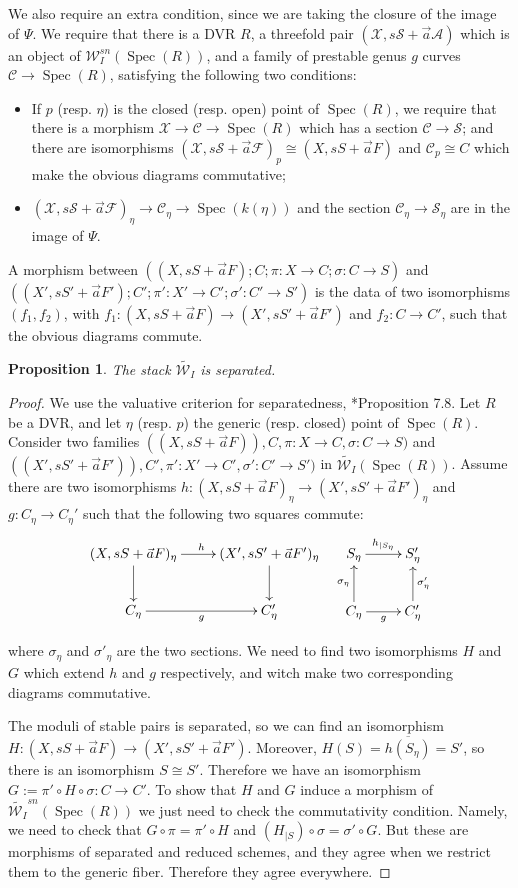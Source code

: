 \documentclass[11pt]{amsart}
\newcommand{\cC}{\mathcal{C}}
\newcommand{\cE}{\mathcal{W}}
\newcommand{\cX}{\mathcal{X}}
\newcommand{\cS}{\mathcal{S}}
\newcommand{\spec}{\operatorname{Spec}}
\newtheorem{Prop}[theorem]{Proposition}
\theoremstyle{definition}
\begin{document}
We also require an extra condition, since we are taking the closure of the image of $\Psi$.
We require that there is a DVR $R$, a
threefold pair $(\cX,s\cS+\vec{a}\mathcal{A}) $ which is an object
of $\cE_I^{sn}(\spec(R))$, and a family of prestable genus $g$ curves $\cC \to \spec(R)$, satisfying the following two conditions:
\begin{itemize}
 \item If $p$ (resp. $\eta$) is the closed (resp. open) point of $\spec(R)$, we require that there is a morphism $\cX \to \cC \to\spec(R)$
 which has a section $\cC \to \cS$; and there are isomorphisms
$(\cX,s\cS+\vec{a}\mathcal{F})_p \cong  (X,sS+\vec{a}F)$ and $\cC_p \cong C$ which make the obvious diagrams commutative;
\item $(\cX,s\cS+\vec{a}\mathcal{F})_\eta \to \cC_\eta \to \spec(k(\eta))$ and the section $\cC_\eta \to \cS_\eta$ are in the
image of $\Psi$.
\end{itemize}
A morphism between $((X,sS+\vec{a}F); C; \pi:X\to C; \sigma:C \to S)$ and
$((X',sS'+\vec{a}F'); C'; \pi':X'\to C'; \sigma':C' \to S')$ is the data of two isomorphisms $(f_1,f_2)$, with
$f_1:(X,sS+\vec{a}F) \to (X',sS'+\vec{a}F')$ and $f_2:C \to C'$, such that the obvious diagrams commute.
\begin{Prop}\label{Prop:the:auxiliary:stack:is:separated}
 The stack $\widetilde{\cE_I}$ is separated.
\end{Prop}
\begin{proof}
We use the valuative criterion for separatedness, \cite{LMB}*{Proposition 7.8}.
Let $R$ be a DVR, and let $\eta$ (resp. $p$) the generic (resp. closed) point of $\spec(R)$. Consider
two families $((X,sS+\vec{a}F)),C, \pi:X \to C, \sigma:C \to S)$ and
$((X',sS'+\vec{a}F')),C', \pi':X' \to C', \sigma':C' \to S')$ in $\widetilde{\cE_I}(\spec(R))$.
Assume there are two isomorphisms $h:(X,sS+\vec{a}F)_\eta \to (X',sS'+\vec{a}F')_\eta$ and $g:C_\eta \to C_\eta'$ such that the following two squares
commute:
$$\xymatrix{(X,sS+\vec{a}F)_\eta \ar[r]^{h} \ar[d] & (X',sS'+\vec{a}F')_\eta\ar[d] \\ C_\eta \ar[r]_{g} & C'_\eta} \text{ } \text{ }
\xymatrix{S_\eta \ar[r]^{h_{|S_\eta}} & S'_\eta \\ C_\eta \ar[r]_{g} \ar[u]^{\sigma_\eta} & C'_\eta \ar[u]_{\sigma'_\eta}}$$

where $\sigma_\eta$ and $\sigma'_\eta$ are the two sections. We need to find two isomorphisms $H$
and $G$ which extend $h$ and $g$ respectively, and witch make two corresponding diagrams commutative.

The moduli of stable pairs is separated, so we can find an isomorphism $H:(X,sS+\vec{a}F) \to (X',sS'+\vec{a}F')$.
Moreover, $H(S)= \overline{h(S_\eta)}=S'$, so there is an isomorphism $S \cong S'$.
Therefore we have an isomorphism $G:=\pi'\circ H \circ \sigma :C \to C'$.
To show that $H$ and $G$ induce
a morphism of $\widetilde{\cE_I}^{sn}(\spec(R))$ we just need to check the commutativity condition. Namely, we need to check that $G \circ \pi=\pi' \circ H$ and $(H_{|S})\circ \sigma = \sigma' \circ G$. But these are morphisms of separated and reduced schemes, and they agree when we restrict them to the generic fiber. Therefore they agree everywhere.
\end{proof}
\end{document}
